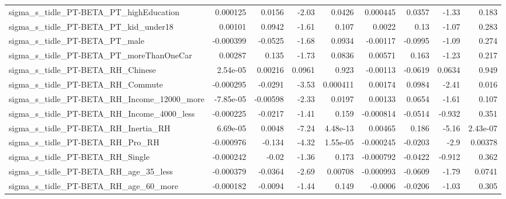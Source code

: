 \begin{tabular}{lrrrrrrrr}
sigma\_s\_tidle\_PT-BETA\_PT\_highEducation             &    0.000125 &       0.0156 &    -2.03 &   0.0426 &   0.000445 &      0.0357 &        -1.33 &         0.183 \\
sigma\_s\_tidle\_PT-BETA\_PT\_kid\_under18               &     0.00101 &       0.0942 &    -1.61 &    0.107 &     0.0022 &        0.13 &        -1.07 &         0.283 \\
sigma\_s\_tidle\_PT-BETA\_PT\_male                      &   -0.000399 &      -0.0525 &    -1.68 &   0.0934 &   -0.00117 &     -0.0995 &        -1.09 &         0.274 \\
sigma\_s\_tidle\_PT-BETA\_PT\_moreThanOneCar            &     0.00287 &        0.135 &    -1.73 &   0.0836 &    0.00571 &       0.163 &        -1.23 &         0.217 \\
sigma\_s\_tidle\_PT-BETA\_RH\_Chinese                   &    2.54e-05 &      0.00216 &   0.0961 &    0.923 &   -0.00113 &     -0.0619 &       0.0634 &         0.949 \\
sigma\_s\_tidle\_PT-BETA\_RH\_Commute                   &   -0.000295 &      -0.0291 &    -3.53 & 0.000411 &    0.00174 &      0.0984 &        -2.41 &         0.016 \\
sigma\_s\_tidle\_PT-BETA\_RH\_Income\_12000\_more         &   -7.85e-05 &     -0.00598 &    -2.33 &   0.0197 &    0.00133 &      0.0654 &        -1.61 &         0.107 \\
sigma\_s\_tidle\_PT-BETA\_RH\_Income\_4000\_less          &   -0.000225 &      -0.0217 &    -1.41 &    0.159 &  -0.000814 &     -0.0514 &       -0.932 &         0.351 \\
sigma\_s\_tidle\_PT-BETA\_RH\_Inertia\_RH                &    6.69e-05 &       0.0048 &    -7.24 & 4.48e-13 &    0.00465 &       0.186 &        -5.16 &      2.43e-07 \\
sigma\_s\_tidle\_PT-BETA\_RH\_Pro\_RH                    &   -0.000976 &       -0.134 &    -4.32 & 1.55e-05 &  -0.000245 &     -0.0203 &         -2.9 &       0.00378 \\
sigma\_s\_tidle\_PT-BETA\_RH\_Single                    &   -0.000242 &        -0.02 &    -1.36 &    0.173 &  -0.000792 &     -0.0422 &       -0.912 &         0.362 \\
sigma\_s\_tidle\_PT-BETA\_RH\_age\_35\_less               &   -0.000379 &      -0.0364 &    -2.69 &  0.00708 &  -0.000993 &     -0.0609 &        -1.79 &        0.0741 \\
sigma\_s\_tidle\_PT-BETA\_RH\_age\_60\_more               &   -0.000182 &      -0.0094 &    -1.44 &    0.149 &    -0.0006 &     -0.0206 &        -1.03 &         0.305 \\

\end{tabular}
